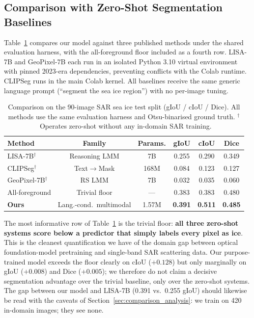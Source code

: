 \documentclass[remotesensing,article,accept,moreauthors,pdftex]{Definitions/mdpi}
\begin{document}
\subsection{Comparison with Zero-Shot Segmentation Baselines}

Table~\ref{tab:comparison} compares our model against three published methods
under the shared evaluation harness, with the all-foreground floor included as
a fourth row. LISA-7B and GeoPixel-7B each run in an isolated Python 3.10
virtual environment with pinned 2023-era dependencies, preventing conflicts
with the Colab runtime. CLIPSeg runs in the main Colab kernel. All baselines
receive the same generic language prompt (``segment the sea ice region'') with
no per-image tuning.

\begin{table}[H]
\centering
\small
\caption{Comparison on the 90-image SAR sea ice test split
(gIoU / cIoU / Dice). All methods use the same evaluation harness and
Otsu-binarised ground truth. $^\dag$~Operates zero-shot without any in-domain
SAR training.}
\label{tab:comparison}
\begin{tabular}{lccccc}
\toprule
Method & Family & Params. & gIoU & cIoU & Dice \\
\midrule
LISA-7B$^\dag$ \cite{lai2024lisa}
    & Reasoning LMM
    & 7B
    & 0.255 & 0.290 & 0.349 \\

CLIPSeg$^\dag$ \cite{luddecke2022image}
    & Text$\rightarrow$Mask
    & 168M
    & 0.084 & 0.123 & 0.127 \\

GeoPixel-7B$^\dag$ \cite{geopixel2024}
    & RS LMM
    & 7B
    & 0.032 & 0.035 & 0.060 \\

All-foreground
    & Trivial floor
    & ---
    & 0.383 & 0.383 & 0.480 \\

\midrule
\textbf{Ours}
    & Lang.-cond.\ multimodal
    & 1.57M
    & \textbf{0.391}
    & \textbf{0.511}
    & \textbf{0.485} \\
\bottomrule
\end{tabular}
\end{table}

The most informative row of Table~\ref{tab:comparison} is the trivial floor:
\textbf{all three zero-shot systems score below a predictor that simply labels
every pixel as ice}. This is the cleanest quantification we have of the domain
gap between optical foundation-model pretraining and single-band SAR
scattering data. Our purpose-trained model exceeds the floor clearly on cIoU
($+0.128$) but only marginally on gIoU ($+0.008$) and Dice ($+0.005$); we
therefore do not claim a decisive segmentation advantage over the trivial
baseline, only over the zero-shot systems. The gap between our model and
LISA-7B (0.391 vs.\ 0.255 gIoU) should likewise be read with the caveats of
Section~\ref{sec:comparison_analysis}: we train on 420 in-domain images; they
see none.
\end{document}
